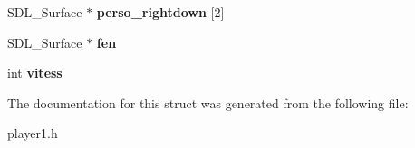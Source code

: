 \begin{DoxyCompactItemize}
\item 
S\+D\+L\+\_\+\+Surface $\ast$ {\bfseries perso\+\_\+rightdown} \mbox{[}2\mbox{]}\hypertarget{structplayer_aeac32a2525d394b2254d68f98d29e49f}{}\label{structplayer_aeac32a2525d394b2254d68f98d29e49f}

\item 
S\+D\+L\+\_\+\+Surface $\ast$ {\bfseries fen}\hypertarget{structplayer_acd52240d031b7b0492a1479293a1aaf9}{}\label{structplayer_acd52240d031b7b0492a1479293a1aaf9}

\item 
int {\bfseries vitess}\hypertarget{structplayer_a920b2184c438083e80b37dc9d4995464}{}\label{structplayer_a920b2184c438083e80b37dc9d4995464}

\end{DoxyCompactItemize}


The documentation for this struct was generated from the following file\+:\begin{DoxyCompactItemize}
\item 
player1.\+h\end{DoxyCompactItemize}
